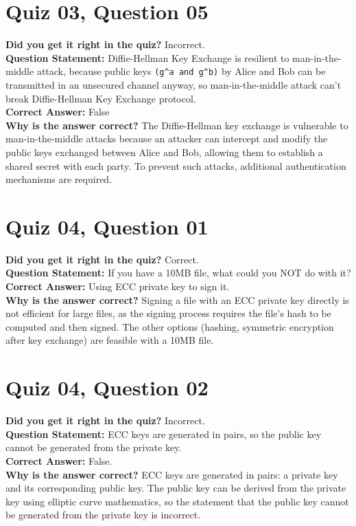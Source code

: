 \documentclass{article}
\begin{document}
\vspace{1em}

\section*{Quiz 03, Question 05}
\textbf{Did you get it right in the quiz?} Incorrect. \\
\textbf{Question Statement:} Diffie-Hellman Key Exchange is resilient to man-in-the-middle attack, because public keys \verb|(g^a and g^b)| by Alice and Bob can be transmitted in an unsecured channel anyway, so man-in-the-middle attack can't break Diffie-Hellman Key Exchange protocol. \\
\textbf{Correct Answer:} False \\
\textbf{Why is the answer correct?} The Diffie-Hellman key exchange is vulnerable to man-in-the-middle attacks because an attacker can intercept and modify the public keys exchanged between Alice and Bob, allowing them to establish a shared secret with each party. To prevent such attacks, additional authentication mechanisms are required.


\section*{Quiz 04, Question 01}
\textbf{Did you get it right in the quiz?} Correct. \\
\textbf{Question Statement:} If you have a 10MB file, what could you NOT do with it? \\
\textbf{Correct Answer:} Using ECC private key to sign it. \\
\textbf{Why is the answer correct?} Signing a file with an ECC private key directly is not efficient for large files, as the signing process requires the file's hash to be computed and then signed. The other options (hashing, symmetric encryption after key exchange) are feasible with a 10MB file.

\vspace{1em}

\section*{Quiz 04, Question 02}
\textbf{Did you get it right in the quiz?} Incorrect. \\
\textbf{Question Statement:} ECC keys are generated in pairs, so the public key cannot be generated from the private key. \\
\textbf{Correct Answer:} False. \\
\textbf{Why is the answer correct?} ECC keys are generated in pairs: a private key and its corresponding public key. The public key can be derived from the private key using elliptic curve mathematics, so the statement that the public key cannot be generated from the private key is incorrect.
\end{document}
